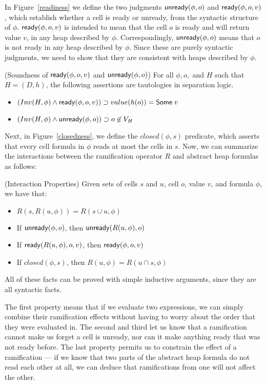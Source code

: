 \documentclass[preprint,natbib]{sigplanconf}
\begin{document}
In Figure~\ref{readiness} we define the two judgments $\mbox{\textsf{{unready}}}({\phi}, {o})$
and $\mbox{\textsf{{ready}}}({\phi}, {o}, {v})$, which establish whether a cell is ready or
unready, from the syntactic structure of $\phi$. $\mbox{\textsf{{ready}}}({\phi}, {o}, {v})$ is intended
to mean that the cell $o$ is ready and will return value $v$, in any heap 
described by $\phi$. Correspondingly, $\mbox{\textsf{{unready}}}({\phi}, {o})$ means that $o$ is not 
ready in any heap described by $\phi$. Since these are purely syntactic judgments, 
we need to show that they are consistent with heaps described by $\phi$. 

\begin{prop}{(Soundness of $\mbox{\textsf{{ready}}}({\phi}, {o}, {v})$ and $\mbox{\textsf{{unready}}}({\phi}, {o})$)}
For all $\phi, o,$ and $H$ such that $H = (D,h)$, the following assertions
are tautologies in separation logic. 

\begin{itemize}
\item $(Inv(H, \phi) \land \mbox{\textsf{{ready}}}({\phi}, {o}, {v})) \supset value(h(o)) = \mbox{\textsf{{Some}}}\;v$
\item $(Inv(H, \phi) \land \mbox{\textsf{{unready}}}({\phi}, {o})) \supset o \not\in V_H$
\end{itemize}
\end{prop}

Next, in Figure~\ref{closedness}, we define the $closed(\phi, s)$
predicate, which asserts that every cell formula in $\phi$ reads at
most the cells in $s$. Now, we can summarize the interactions between
the ramification operator $R$ and abstract heap formulas as follows:

\begin{prop}{(Interaction Properties)}
Given sets of cells $s$ and $u$, cell $o$, value $v$, and formula $\phi$, we have
that:
\begin{itemize}
\item $R(s, R(u, \phi)) = R(s \cup u, \phi)$
\item If $\mbox{\textsf{{unready}}}({\phi}, {o})$, then $\mbox{\textsf{{unready}}}({R(u, \phi)}, {o})$ 
\item If $\mbox{\textsf{{ready}}}({R(u, \phi)}, {o}, {v})$, then $\mbox{\textsf{{ready}}}({\phi}, {o}, {v})$ 
\item If $closed(\phi, s)$, then $R(u, \phi) = R(u \cap s, \phi)$ 
\end{itemize}
\end{prop}

All of these facts can be proved with simple inductive arguments, since
they are all syntactic facts. 

The first property means that if we evaluate two expressions, we can
simply combine their ramification effects without having to worry
about the order that they were evaluated in. The second and third let
us know that a ramification cannot make us forget a cell is unready,
nor can it make anything ready that was not ready before. The last
property permits us to constrain the effect of a ramification --- if we
know that two parts of the abstract heap formula do not read each
other at all, we can deduce that ramifications from one will not
affect the other.
\end{document}
